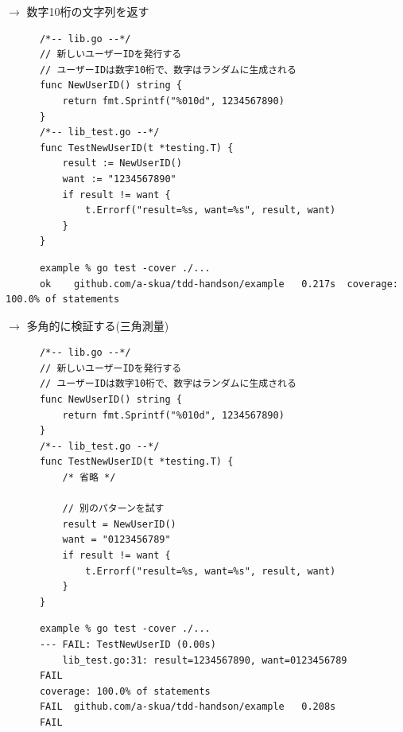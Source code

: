 \documentclass[aspectratio=169]{beamer}
\begin{document}
\begin{frame}[fragile]
  $\rightarrow$ 数字10桁の文字列を返す
  {
    \scriptsize
    \begin{verbatim}
      /*-- lib.go --*/
      // 新しいユーザーIDを発行する
      // ユーザーIDは数字10桁で、数字はランダムに生成される
      func NewUserID() string {
          return fmt.Sprintf("%010d", 1234567890)
      }
      /*-- lib_test.go --*/
      func TestNewUserID(t *testing.T) {
          result := NewUserID()
          want := "1234567890"
          if result != want {
              t.Errorf("result=%s, want=%s", result, want)
          }
      }
    \end{verbatim}
  }
  {
    \color{gray}
    \scriptsize
    \begin{verbatim}
      example % go test -cover ./...
      ok  	github.com/a-skua/tdd-handson/example	0.217s	coverage: 100.0% of statements
    \end{verbatim}
  }
\end{frame}


\begin{frame}[fragile]
  $\rightarrow$
  多角的に検証する(三角測量)
  {
    \scriptsize
    \begin{verbatim}
      /*-- lib.go --*/
      // 新しいユーザーIDを発行する
      // ユーザーIDは数字10桁で、数字はランダムに生成される
      func NewUserID() string {
          return fmt.Sprintf("%010d", 1234567890)
      }
      /*-- lib_test.go --*/
      func TestNewUserID(t *testing.T) {
          /* 省略 */

          // 別のパターンを試す
          result = NewUserID()
          want = "0123456789"
          if result != want {
              t.Errorf("result=%s, want=%s", result, want)
          }
      }
    \end{verbatim}
  }
  {
    \color{gray}
    \scriptsize
    \begin{verbatim}
      example % go test -cover ./...
      --- FAIL: TestNewUserID (0.00s)
          lib_test.go:31: result=1234567890, want=0123456789
      FAIL
      coverage: 100.0% of statements
      FAIL	github.com/a-skua/tdd-handson/example	0.208s
      FAIL
    \end{verbatim}
  }
\end{frame}
\end{document}
